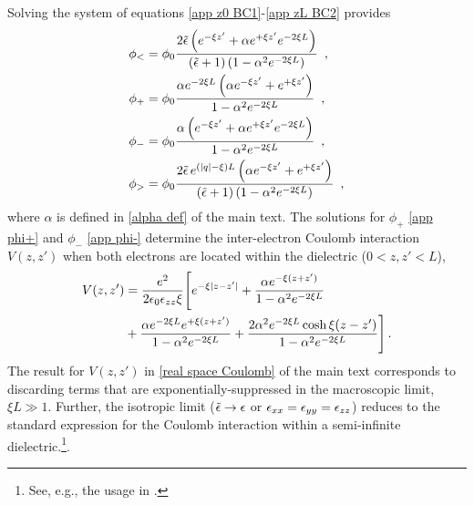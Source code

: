Solving the system of equations \eqref{app z0 BC1}-\eqref{app zL BC2} provides
\begin{align}
    \label{app phi<}
    \phi_< &=
    \phi_0
    \frac{2\tilde{\epsilon}\left(
    e^{-\xi z'}+\alpha e^{+\xi z'}e^{-2\xi L}
    \right)}{\left(\tilde{\epsilon}+1\right)\left( 1-\alpha^2 e^{-2\xi L}\right)}
    \,\,\,,
    \\
    \label{app phi+}
    \phi_+ &=
    \phi_0
    \frac{\alpha e^{-2\xi L}\left(
    \alpha e^{-\xi z'}+e^{+\xi z'}
    \right)}{1-\alpha^2 e^{-2\xi L}}
    \,\,\,,
    \\
    \label{app phi-}
    \phi_- &=
    \phi_0
    \frac{\alpha \left(
     e^{-\xi z'}+\alpha e^{+\xi z'}e^{-2\xi L}
    \right)}{1-\alpha^2 e^{-2\xi L}}
    \,\,\,,
    \\
    \label{app phi>}
    \phi_> &=
    \phi_0
    \frac{2\tilde{\epsilon} \,e^{(|q|-\xi)L}\left(
    \alpha e^{-\xi z'} +e^{+\xi z'}
    \right)}{\left(\tilde{\epsilon}+1\right)\left( 1-\alpha^2 e^{-2\xi L}\right)}
    \,\,\,,
\end{align}
where $\alpha$ is defined in \eqref{alpha def} of the main text.  The solutions for $\phi_+$ \eqref{app phi+} and $\phi_-$ \eqref{app phi-} determine the inter-electron Coulomb interaction $V(z,z')$ when both electrons are located within the dielectric ($0<z, z'<L$),
\begin{align}
    \label{app real space Coulomb}
    V(z,z') &=
    \frac{e^2}{2\epsilon_0 \epsilon_{zz}\xi}
    \Bigg[
    e^{-\xi |z-z'|}
    +
    \frac{\alpha e^{-\xi(z+z')}}{1-\alpha^2 e^{-2\xi L}}
    \\ \nonumber &+
    \frac{\alpha e^{-2\xi L}
    e^{+\xi(z+z')}}{1-\alpha^2 e^{-2\xi L}}
    +
    \frac{2\alpha^2 e^{-2\xi L}\cosh\xi(z-z')}{1-\alpha^2 e^{-2\xi L}}
    \Bigg]
    \,.
\end{align}
The result for $V(z,z')$ in \eqref{real space Coulomb} of the main text corresponds to discarding terms that are exponentially-suppressed in the macroscopic limit, $\xi L\gg 1$.  Further, the isotropic limit ($\tilde{\epsilon}\to\epsilon$ or $\epsilon_{xx}=\epsilon_{yy}=\epsilon_{zz}$) reduces to the standard expression for the Coulomb interaction within a semi-infinite dielectric.\footnote{See, e.g., the usage in \cite{Jain1985_2}.}.

